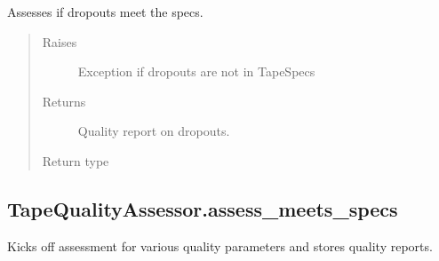 \documentclass[letterpaper,10pt,english]{sphinxmanual}
\begin{document}
\begin{fulllineitems}
\begin{fulllineitems}
\label{\detokenize{generated/quality_assessment.quality_assessor.TapeQualityAssessor.assess_dropouts:quality_assessment.quality_assessor.TapeQualityAssessor.assess_dropouts}}
\sphinxAtStartPar
Assesses if drop\sphinxhyphen{}outs meet the specs.
\begin{quote}\begin{description}
\item[{Raises}] \leavevmode
\sphinxAtStartPar
{} \textendash{} Exception if drop\sphinxhyphen{}outs are not in TapeSpecs

\item[{Returns}] \leavevmode
\sphinxAtStartPar
Quality report on drop\sphinxhyphen{}outs.

\item[{Return type}] \leavevmode
\sphinxAtStartPar
{\hyperref[\detokenize{generated/quality_assessment.data_types.QualityReport:quality_assessment.data_types.QualityReport}]{}}

\end{description}\end{quote}

\end{fulllineitems}



\subsection{TapeQualityAssessor.assess\_meets\_specs}
\label{\detokenize{generated/quality_assessment.quality_assessor.TapeQualityAssessor.assess_meets_specs:tapequalityassessor-assess-meets-specs}}\label{\detokenize{generated/quality_assessment.quality_assessor.TapeQualityAssessor.assess_meets_specs::doc}}

\begin{fulllineitems}
\label{\detokenize{generated/quality_assessment.quality_assessor.TapeQualityAssessor.assess_meets_specs:quality_assessment.quality_assessor.TapeQualityAssessor.assess_meets_specs}}
\sphinxAtStartPar
Kicks off assessment for various quality parameters and stores
quality reports.


\end{fulllineitems}
\end{fulllineitems}
\end{document}
